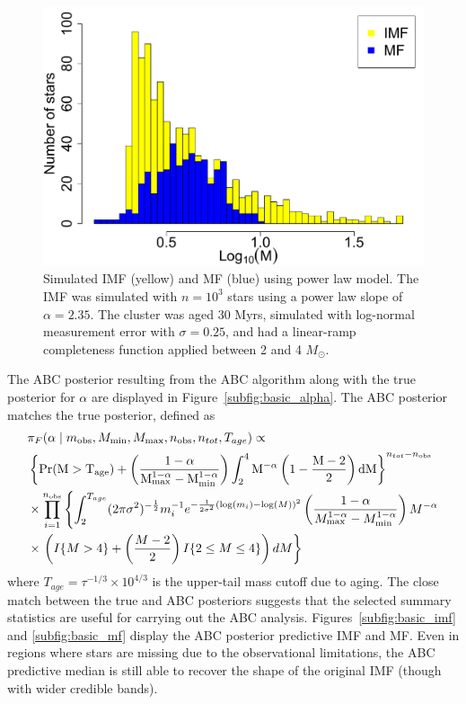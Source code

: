 \documentclass[ejs]{imsart}
\numberwithin{equation}{section}
\theoremstyle{plain}
\newcommand{\Proba}{\rm{Pr}}
\newcommand{\Msun}{M_{\odot}}
\newcommand{\mobs}{m_{\text{obs}}}
\newcommand{\nobs}{n_{\text{obs}}}
\begin{document}
\begin{figure}[htbp]
\centering
\includegraphics[width=.5\textwidth]{figures/sim_basic_imf_mf_log10.pdf}       
\caption{Simulated IMF (yellow) and MF (blue) using power law model.  The IMF was simulated with $n = 10^3$ stars using a power law slope of $\alpha = 2.35$.  The cluster was aged 30 Myrs, simulated with log-normal measurement error with $\sigma = 0.25$, and had a linear-ramp completeness function applied between 2 and 4 $\Msun$.
} \label{fig:abc_simple_data}
\end{figure}





The ABC posterior resulting from the ABC algorithm along with the true posterior for $\alpha$ are displayed in Figure~\ref{subfig:basic_alpha}.  The ABC posterior matches the true posterior, defined as 
\begin{align}
&\pi_F(\alpha \mid  \mobs, M_{\min}, M_{\max}, \nobs, n_{tot}, T_{age}) \propto  \label{eq:simple_posterior}\\ 
&\left \{\Proba(M>T_{age})+\left(\frac{1-\alpha}{M_{\max}^{1-\alpha}-M_{\min}^{1-\alpha}}\right)\int_2^4 M^{-\alpha}\left(1-\frac{M-2}{2}\right )dM\right \}^{n_{tot}-\nobs}  \nonumber \\ \nonumber
& \times \prod_{i=1}^{\nobs}\left\{ \int_2^{T_{age}}(2\pi\sigma^2)^{-\frac{1}{2}}m_i^{-1}e^{-\frac{1}{2\sigma^2}(\log(m_i)-\log(M))^2} \left(\frac{1-\alpha}{M_{\max}^{1-\alpha}-M_{\min}^{1-\alpha}}\right)M^{-\alpha} \right.\\ \nonumber
& \times  \left.\left(I\{M>4\}+\left(\frac{M-2}{2}\right)I\{2\leq M\leq 4\}\right) dM \right\} 
\end{align}
where $T_{age} = \tau^{-1/3} \times 10^{4/3}$ is the upper-tail mass cutoff due to aging.  The close match between the true and ABC posteriors suggests that the selected summary statistics are useful for carrying out the ABC analysis.  Figures~\ref{subfig:basic_imf} and \ref{subfig:basic_mf} display the ABC posterior predictive IMF and MF.  Even in regions where stars are missing due to the observational limitations, the ABC predictive median is still able to recover the shape of the original IMF (though with wider credible bands).
\end{document}
